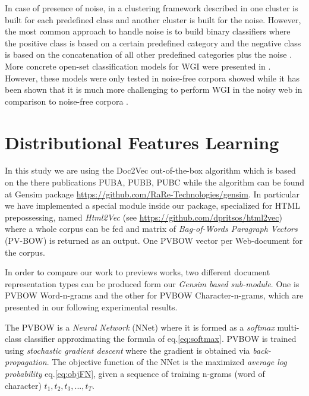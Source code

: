 \documentclass[runningheads]{llncs}
\begin{document}
In case of presence of noise, in a clustering framework described in \citep{kennedy2005automatic} one cluster is built for each predefined class and another cluster is built for the noise. However, the most common approach to handle noise is to build binary classifiers where the positive class is based on a certain predefined category and the negative class is based on the concatenation of all other predefined categories plus the noise \citep{kennedy2005automatic,dong2006binary,levering2008using}. More concrete open-set classification models for WGI were presented in \citep{stubbe2007genre,pritsos2013open}. However, these models were only tested in noise-free corpora showed while it has been shown that it is much more challenging to perform WGI in the noisy web in comparison to noise-free corpora \citep{pritsos2015clef,Asheghi2015}.



\section{Distributional Features Learning}\label{sec:Gensim}

In this study we are using the Doc2Vec out-of-the-box algorithm which is based on the there publications PUBA, PUBB, PUBC while the algorithm can be found at Gensim package \url{https://github.com/RaRe-Technologies/gensim}. In particular we have implemented a special module inside our package, specialized for HTML prepossessing, named \textit{Html2Vec} (see \url{https://github.com/dpritsos/html2vec}) where a whole corpus can be fed and matrix of \textit{Bag-of-Words Paragraph Vectors} (PV-BOW) is returned as an output. One PVBOW vector per Web-document for the corpus.

In order to compare our work to previews works, two different document representation types can be produced form our \textit{Gensim based sub-module}. One is PVBOW Word-n-grams and the other for PVBOW Character-n-grams, which are presented in our following experimental results.

The PVBOW is a \textit{Neural Network} (NNet) where it is formed as a \textit{softmax} multi-class classifier approximating the formula of eq.\ref{eq:softmax}. PVBOW is trained using \textit{stochastic gradient descent} where the gradient is obtained via \textit{back-propagation}. The objective function of the NNet is the maximized \textit{average log probability} eq.\ref{eq:objFN}, given a sequence of training n-grams (word of character) $t_{1}, t_{2}, t_{3}, ..., t_{T}$.
\end{document}
